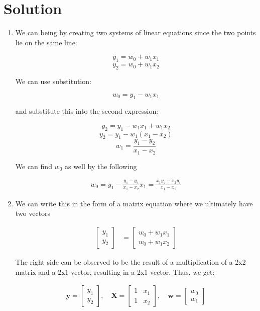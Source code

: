 \documentclass{../harvardml}
\theoremstyle{definition}
\theoremstyle{plain}
\newenvironment{solution}
  {\color{blue}\section*{Solution}}
{}
\begin{document}
\begin{solution}
	\begin{enumerate}
	    \item We can being by creating two systems of linear equations since the two points lie on the same line:

        \[
        y_1 = w_0 + w_1 x_1
        \]
        \[
        y_2 = w_0 + w_1 x_2
        \]

        We can use substitution:

        \[
        w_0 = y_1 - w_1 x_1
        \]

        and substitute this into the second expression:

        \[
        y_2 = y_1 - w_1 x_1 + w_1 x_2
        \]
        \[
        y_2 = y_1 - w_1(x_1 - x_2)
        \]
        \[
        w_1 = \frac{y_1 - y_2}{x_1 - x_2}
        \]

        We can find $w_0$ as well by the following

        \begin{align*}
            w_0 = y_1 - \frac{y_1 - y_2}{x_1 - x_2} x_1 = \frac{x_1y_2 - x_2y_1 }{x_1 - x_2}
        \end{align*}

        \item We can write this in the form of a matrix equation where we ultimately have two vectors

        \begin{align*}
            \begin{bmatrix}
                y_1 \\
                y_2
            \end{bmatrix}
            &=
            \begin{bmatrix}
                w_0 + w_1 x_1 \\
                w_0 + w_1 x_2
            \end{bmatrix}
        \end{align*}

        The right side can be observed to be the result of a multiplication of a 2x2 matrix and a 2x1 vector, resulting in a 2x1 vector. Thus, we get:

        \begin{align*}
            \mathbf{y} = 
            \begin{bmatrix}
                y_1 \\
                y_2
            \end{bmatrix}
            , \quad
            \mathbf{X} = 
            \begin{bmatrix}
                1 & x_1 \\
                1 & x_2
            \end{bmatrix}
            , \quad
            \mathbf{w} = 
            \begin{bmatrix}
                w_0 \\
                w_1
            \end{bmatrix}
        \end{align*}


\end{enumerate}
\end{solution}
\end{document}
